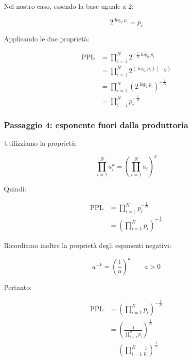 Nel nostro caso, essendo la base uguale a $2$:

\begin{equation}
    2^{\log_2 p_i}=p_i
\end{equation}

Applicando le due proprietà:

\begin{equation}
    \begin{aligned}
        \mathrm{PPL}
        &= \prod_{i=1}^{N}
            2^{-\frac{1}{N}\log_2 p_i}\\[6pt]
        &= \prod_{i=1}^{N}
            2^{(\log_2 p_i)(-\frac{1}{N})}\\[6pt]
        &= \prod_{i=1}^{N}
            \left(2^{\log_2 p_i}\right)^{-\frac{1}{N}}\\[6pt]
        &= \prod_{i=1}^{N}p_i^{-\frac{1}{N}}
    \end{aligned}
\end{equation}

\subsubsection*{Passaggio 4: esponente fuori dalla produttoria}

Utilizziamo la proprietà:

\begin{equation}
    \boxed{
        \prod_{i=1}^{N}a_i^k
        = \left(\prod_{i=1}^{N}a_i\right)^k
    }
\end{equation}

Quindi:

\begin{equation}
    \begin{aligned}
        \mathrm{PPL}
        &= \prod_{i=1}^{N}p_i^{-\frac{1}{N}}\\[6pt]
        &= \left(\prod_{i=1}^{N}p_i\right)^{-\frac{1}{N}}
    \end{aligned}
\end{equation}

Ricordiamo inoltre la proprietà degli esponenti negativi:

\begin{equation}
    \boxed{a^{-k}=\left(\frac{1}{a}\right)^k}
    \qquad a>0
\end{equation}

Pertanto:

\begin{equation}
    \begin{aligned}
        \mathrm{PPL}
        &= \left(\prod_{i=1}^{N}p_i\right)^{-\frac{1}{N}}\\[6pt]
        &= \left(\frac{1}{\prod_{i=1}^{N}p_i}\right)^{\frac{1}{N}}\\[6pt]
        &= \boxed{
            \left(\prod_{i=1}^{N}\frac{1}{p_i}\right)^{\frac{1}{N}}
        }
    \end{aligned}
\end{equation}

